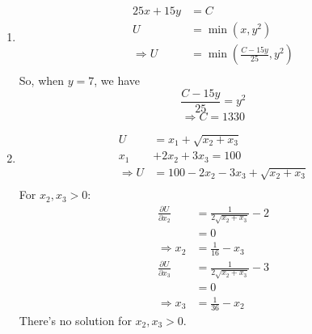 \documentclass{article}
\begin{document}
\begin{enumerate}
\begin{enumerate}
\begin{figure}[!h]
        \end{figure}
    \end{enumerate}
    \item 
    \begin{equation}
        \begin{aligned}
            25x+15y&=C \\
            U&=\min(x,y^2) \\
            \Rightarrow U&=\min(\frac{C-15y}{25},y^2) \\
        \end{aligned} \nonumber
    \end{equation}
    So, when $y=7$, we have
    \begin{equation}
        \frac{C-15y}{25}=y^2 \nonumber
    \end{equation}
    \begin{equation}
        \Rightarrow C=1330 \nonumber
    \end{equation}
    \item 
    \begin{equation}
        \begin{aligned}
            U&=x_1+\sqrt{x_2+x_3} \\
            x_1&+2x_2+3x_3=100 \\
            \Rightarrow U&=100-2x_2-3x_3+\sqrt{x_2+x_3} \\
        \end{aligned} \nonumber
    \end{equation}
    For $x_2,x_3>0$:
    \begin{equation}
        \begin{aligned}
            \frac{\partial U}{\partial x_2}
            &=\frac{1}{2\sqrt{x_2+x_3}}-2 \\
            &=0 \\
            \Rightarrow x_2&=\frac{1}{16}-x_3
        \end{aligned} \nonumber
    \end{equation}
    \begin{equation}
        \begin{aligned}
            \frac{\partial U}{\partial x_3}
            &=\frac{1}{2\sqrt{x_2+x_3}}-3 \\
            &=0 \\
            \Rightarrow x_3&=\frac{1}{36}-x_2
        \end{aligned} \nonumber
    \end{equation}
    There's no solution for $x_2,x_3>0$.\par

\end{enumerate}
\end{document}
